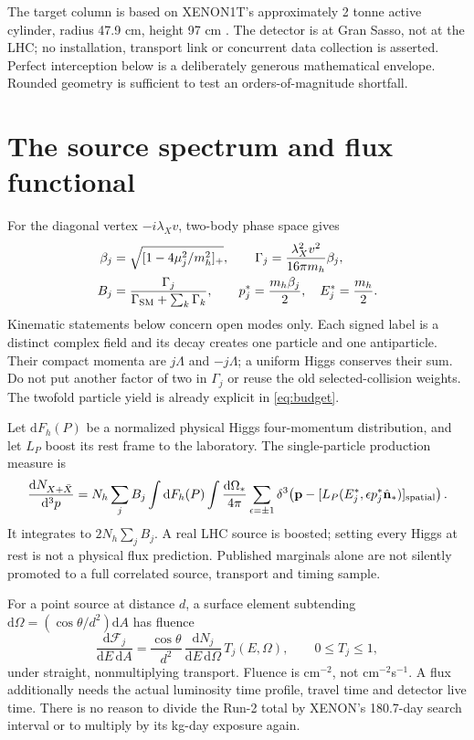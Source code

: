 \documentclass[11pt,a4paper]{article}
\newcommand{\dd}{\mathrm d}
\begin{document}
The target column is based on XENON1T's approximately 2 tonne active
cylinder, radius 47.9 cm, height 97 cm \cite{xenon}. The detector is at
Gran Sasso, not at the LHC; no installation, transport link or concurrent
data collection is asserted. Perfect interception below is a deliberately
generous mathematical envelope. Rounded geometry is sufficient to test
an orders-of-magnitude shortfall.

\section{The source spectrum and flux functional}
For the diagonal vertex $-i\lambda_Xv$, two-body phase space gives
\begin{align}
 \beta_j&=\sqrt{[1-4\mu_j^2/m_h^2]_+},\qquad
 \Gamma_j=\frac{\lambda_X^2v^2}{16\pi m_h}\beta_j,\\
 B_j&=\frac{\Gamma_j}{\Gamma_{\rm SM}+\sum_k\Gamma_k},\qquad
 p_j^*=\frac{m_h\beta_j}{2},\quad E_j^*=\frac{m_h}{2}.
\end{align}
Kinematic statements below concern open modes only.
Each signed label is a distinct complex field and its decay creates
one particle and one antiparticle. Their compact momenta are $j\Lambda$
and $-j\Lambda$; a uniform Higgs conserves their sum. Do not put another
factor of two in $\Gamma_j$ or reuse the old selected-collision weights.
The twofold particle yield is already explicit in \eqref{eq:budget}.

Let $\dd F_h(P)$ be a normalized physical Higgs four-momentum distribution,
and let $L_P$ boost its rest frame to the laboratory. The single-particle
production measure is
\begin{equation}\label{eq:source}
 \frac{\dd N_{X+\bar X}}{\dd^3p}=
 N_h\sum_j B_j\int\dd F_h(P)\int\frac{\dd\Omega_*}{4\pi}
 \sum_{\epsilon=\pm1}
 \delta^3\!\left(\mathbf p-
    [L_P(E_j^*,\epsilon p_j^*\hat{\mathbf n}_*)]_{\rm spatial}\right).
\end{equation}
It integrates to $2N_h\sum_jB_j$. A real LHC source is boosted;
setting every Higgs at rest is not a physical flux prediction. Published
marginals alone are not silently promoted to a full correlated
source, transport and timing sample.

For a point source at distance $d$, a surface element subtending
$\dd\Omega=(\cos\theta/d^2)\dd A$ has fluence
\begin{equation}
 \frac{\dd\mathcal F_j}{\dd E\,\dd A}
 =\frac{\cos\theta}{d^2}\,
   \frac{\dd N_j}{\dd E\,\dd\Omega}\,T_j(E,\Omega),
 \qquad 0\leq T_j\leq1,
\end{equation}
under straight, nonmultiplying transport. Fluence is cm$^{-2}$,
not cm$^{-2}$s$^{-1}$. A flux additionally needs the actual
luminosity time profile, travel time and detector live time.
There is no reason to divide the Run-2 total by XENON's 180.7-day
search interval or to multiply by its kg-day exposure again.
\end{document}

